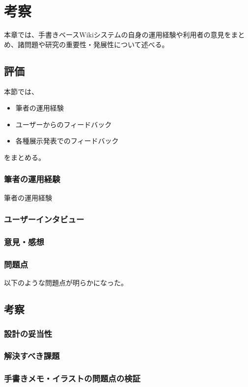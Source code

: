 \chapter{考察}
\label{chap:kosatsu}

本章では、手書きベースWikiシステムの自身の運用経験や利用者の意見をまとめ、諸問題や研究の重要性・発展性について述べる。

\newpage

\section{評価}
本節では、
\begin{itemize}
    \item 筆者の運用経験
    \item ユーザーからのフィードバック
    \item 各種展示発表でのフィードバック
\end{itemize}
をまとめる。

\subsection{筆者の運用経験}
筆者の運用経験

\subsection{ユーザーインタビュー}

\subsection{意見・感想}

\subsection{問題点}
以下のような問題点が明らかになった。


\section{考察}

\subsection{設計の妥当性}

\subsection{解決すべき課題}

\subsection{手書きメモ・イラストの問題点の検証}

